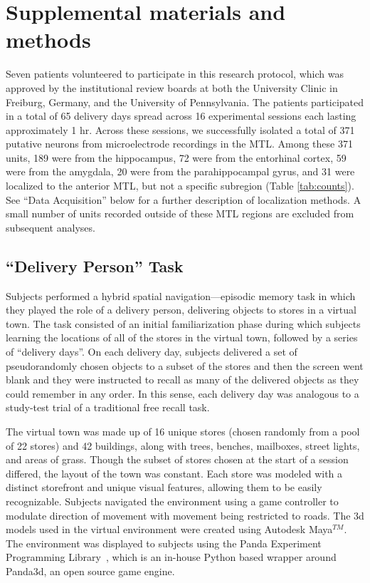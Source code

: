 \section{Supplemental materials and methods}

Seven patients volunteered to participate in this research protocol, which was approved by the institutional review boards at both the University Clinic in Freiburg, Germany, and the University of Pennsylvania.  The patients participated in a total of 65 delivery days spread across 16 experimental sessions each lasting approximately 1 hr.   Across these sessions, we successfully isolated a total of 371 putative neurons from microelectrode recordings in the MTL.  Among these 371 units, 189 were from the hippocampus, 72 were from the entorhinal cortex, 59 were from the amygdala, 20 were from the parahippocampal gyrus, and 31 were localized to the anterior MTL, but not a specific subregion (Table \ref{tab:counts}). See ``Data Acquisition'' below for a further description of localization methods.  A small number of units recorded outside of these MTL regions are excluded from subsequent analyses.

\subsection*{``Delivery Person'' Task}

Subjects performed a hybrid spatial navigation---episodic memory task in which they played the role of a delivery person, delivering objects to stores in a virtual town.  The task consisted of an initial familiarization phase during which subjects learning the locations of all of the stores in the virtual town, followed by a series of ``delivery days''.  On each delivery day, subjects delivered a set of pseudorandomly chosen objects to a subset of the stores and then the screen went blank and they were instructed to recall as many of the delivered objects as they could remember in any order.  In this sense, each delivery day was analogous to a study-test trial of a traditional free recall task.

The virtual town was made up of 16 unique stores (chosen randomly from a pool of 22 stores) and 42 buildings, along with trees, benches, mailboxes, street lights, and areas of grass.  Though the subset of stores chosen at the start of a session differed, the layout of the town was constant. Each store was modeled with a distinct storefront and unique visual features, allowing them to be easily recognizable.  Subjects navigated the environment using a game controller to modulate direction of movement with movement being restricted to roads.  The 3d models used in the virtual environment were created using Autodesk Maya$^{TM}$. The environment was displayed to subjects using the Panda Experiment Programming Library~\cite{SolwEtal13}, which is an in-house Python based wrapper around Panda3d, an open source game engine.

